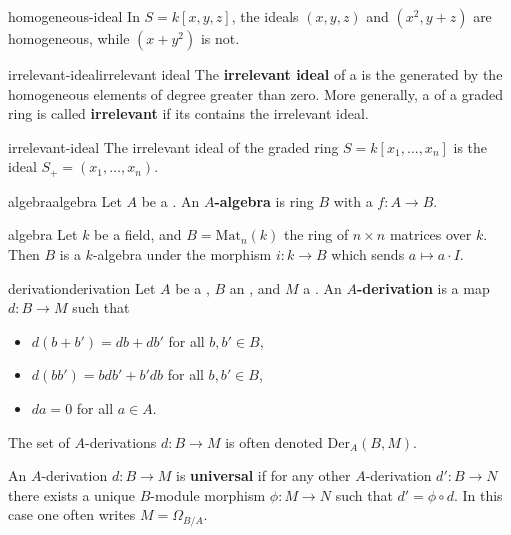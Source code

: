 \begin{example}{homogeneous-ideal}
    In $S = k[x, y, z]$, the ideals $(x, y, z)$ and $(x^2, y + z)$ are homogeneous, while $(x + y^2)$ is not.
\end{example}

\begin{topic}{irrelevant-ideal}{irrelevant ideal}
    The \textbf{irrelevant ideal} of a  is the  generated by the homogeneous elements of degree greater than zero. More generally, a  of a graded ring is called \textbf{irrelevant} if its  contains the irrelevant ideal.
\end{topic}

\begin{example}{irrelevant-ideal}
    The irrelevant ideal of the graded ring $S = k[x_1, \ldots, x_n]$ is the ideal $S_+ = (x_1, \ldots, x_n)$.
\end{example}

\begin{topic}{algebra}{algebra}
    Let $A$ be a . An \textbf{$A$-algebra} is ring $B$ with a  $f : A \to B$.
\end{topic}

\begin{example}{algebra}
    Let $k$ be a field, and $B = \text{Mat}_{n}(k)$ the ring of $n \times n$ matrices over $k$. Then $B$ is a $k$-algebra under the morphism $i : k \to B$ which sends $a \mapsto a \cdot I$.
\end{example}

\begin{topic}{derivation}{derivation}
    Let $A$ be a , $B$ an , and $M$ a . An \textbf{$A$-derivation} is a map $d : B \to M$ such that
    \begin{itemize}
        \item $d(b + b') = db + db'$ for all $b, b' \in B$,
        \item $d(bb') = bdb' + b'db$ for all $b, b' \in B$,
        \item $da = 0$ for all $a \in A$.
    \end{itemize}
    The set of $A$-derivations $d : B \to M$ is often denoted $\text{Der}_A(B, M)$.
    
    An $A$-derivation $d : B \to M$ is \textbf{universal} if for any other $A$-derivation $d' : B \to N$ there exists a unique $B$-module morphism $\phi : M \to N$ such that $d' = \phi \circ d$. In this case one often writes $M = \Omega_{B/A}$.
\end{topic}

